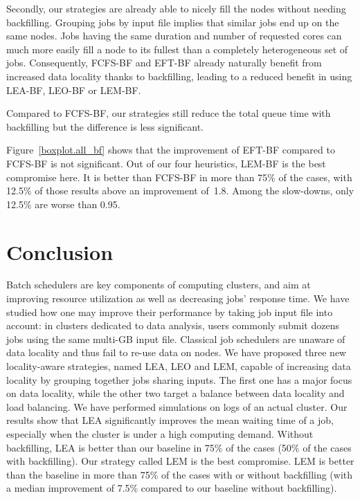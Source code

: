 \documentclass[conference]{IEEEtran}
\begin{document}
Secondly, our strategies are already able to nicely fill the nodes without needing backfilling.
Grouping jobs by input file implies that similar jobs end up on the same nodes.
Jobs having the same duration and number of requested cores can much more easily fill a node to its fullest than a completely heterogeneous set of jobs.
Consequently, FCFS-BF and EFT-BF already naturally benefit from increased data locality thanks to backfilling, leading to a reduced benefit in using LEA-BF, LEO-BF or LEM-BF.

Compared to FCFS-BF, our strategies still reduce the total queue time with backfilling but the difference is less significant.

Figure~\ref{boxplot.all_bf} shows that the improvement of EFT-BF compared to FCFS-BF is not significant.
Out of our four heuristics, LEM-BF is the best compromise here.
It is better than FCFS-BF in more than 75\% of the cases, 
with 12.5\% of those results above an improvement of~1.8.
Among the slow-downs, only 12.5\% are worse than 0.95.

\section{Conclusion}\label{sec.conclusion}

Batch schedulers are key components of computing clusters, and aim at
improving resource utilization as well as decreasing jobs' response
time. We have studied how one may improve their performance by taking
job input file into account: in clusters dedicated to data analysis,
users commonly submit dozens jobs using the same multi-GB input
file. Classical job schedulers are unaware of data locality and thus
fail to re-use data on nodes. We have proposed three new locality-aware
strategies, named LEA, LEO and LEM,
capable of increasing data locality by grouping together 
jobs sharing inputs. The first one has a major focus on data locality,
while the other two target a balance between data locality and load
balancing. We have performed simulations on logs of an actual
cluster. Our results show that LEA significantly improves the mean
waiting time of a job, especially  
when the cluster is under a high computing demand.
Without backfilling, LEA is better than our baseline in 75\% of the
cases (50\% of the cases with backfilling).
Our strategy called LEM is the best compromise. LEM is better than the baseline in more than 75\% of the cases with or without backfilling
(with a median improvement of 7.5\% compared to our baseline without backfilling).
\end{document}
